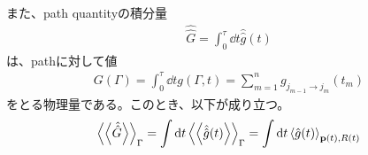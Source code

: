 \documentclass[a4paper,11pt]{jsarticle}
\numberwithin{equation}{section}
\begin{document}
また、path quantityの積分量
\begin{align}
    {\hat{\hat{G}}}= \int_{0}^{\tau} \dd{t} \hat{\hat{g}}(t)
\end{align}
は、pathに対して値
\begin{align}
    G(\Gamma) = \int_{0}^{\tau} \dd{t} g(\Gamma,t) = \sum_{m=1}^{n} g_{j_{m-1} \to j_{m}}(t_{m})
\end{align}
をとる物理量である。このとき、以下が成り立つ。
\begin{align}
    \ev{\ev{\hat{\hat{G}}}}_{\Gamma} = \int \dd{t} \ev{\ev{\hat{\hat{g}}(t)}}_{\Gamma} = \int \dd{t} \ev{\hat{g}(t)}_{\vb{p}(t),R(t)}
\end{align}
\end{document}

